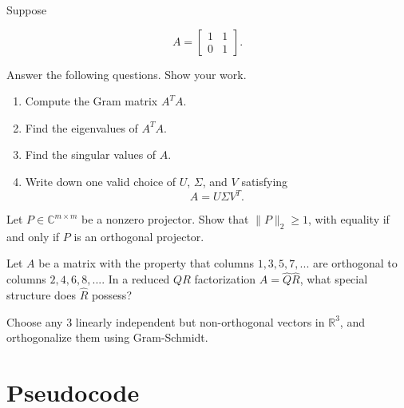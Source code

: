 \documentclass{ximera}
\begin{document}
\begin{exercise}
    Suppose

\[
A =
\begin{bmatrix}
1 & 1\\
0 & 1
\end{bmatrix}.
\]

Answer the following questions. Show your work.

\begin{enumerate}[label=\arabic*.]
    \item Compute the Gram matrix $A^T A$.

    \item Find the eigenvalues of $A^T A$.

    \item Find the singular values of $A$.

    \item Write down one valid choice of $U$, $\Sigma$, and $V$
    satisfying
    \[
    A = U\Sigma V^T.
    \]

\end{enumerate}
\end{exercise}

\begin{exercise}
    Let $P \in \mathbb{C}^{m\times m}$ be a nonzero projector.  Show that $\|P\|_2 \geq 1$, with equality if and only if $P$ is an orthogonal projector.
\end{exercise}

\begin{exercise}
    Let $A$ be a matrix with the property that columns $1,3,5,7,...$ are orthogonal to columns $2,4,6,8,...$.  In a reduced $QR$ factorization $A = \hat{Q}\hat{R}$, what special structure does $\hat{R}$ possess?
\end{exercise}

\begin{exercise}
    Choose any $3$ linearly independent but non-orthogonal vectors in $\mathbb{R}^3$, and orthogonalize them using Gram-Schmidt.
\end{exercise}

\section{Pseudocode}
\end{document}
